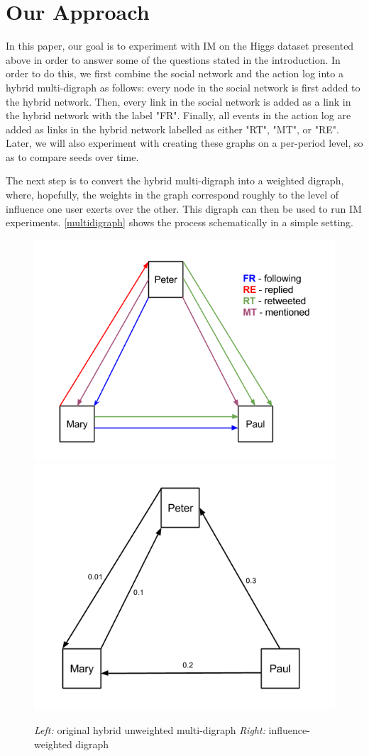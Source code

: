 \documentclass[sigconf]{acmart}
\begin{document}
\section{Our Approach}

In this paper, our goal is to experiment with IM on the Higgs dataset presented above in order to answer some of the questions stated in the introduction. In order to do this, we first combine the social network and the action log into a hybrid multi-digraph as follows: every node in the social network is first added to the hybrid network. Then, every link in the social network is added as a link in the hybrid network with the label "FR". Finally, all events in the action log are added as links in the hybrid network labelled as either "RT", "MT", or "RE". Later, we will also experiment with creating these graphs on a per-period level, so as to compare seeds over time.

The next step is to convert the hybrid multi-digraph into a weighted digraph, where, hopefully, the weights in the graph correspond roughly to the level of influence one user exerts over the other. This digraph can then be used to run IM experiments. \autoref{multidigraph} shows the process schematically in a simple setting. 

\begin{figure}[htbp]
\begin{center}
\includegraphics[width=.5\linewidth]{Figures/MultiDiGraph.png}
\includegraphics[width=.45\linewidth]{Figures/MultiDiGraphII.png}
\caption{\emph{Left:} original hybrid unweighted multi-digraph
\emph{Right: } influence-weighted digraph}
\label{multidigraph}
\end{center}
\end{figure}
\end{document}
